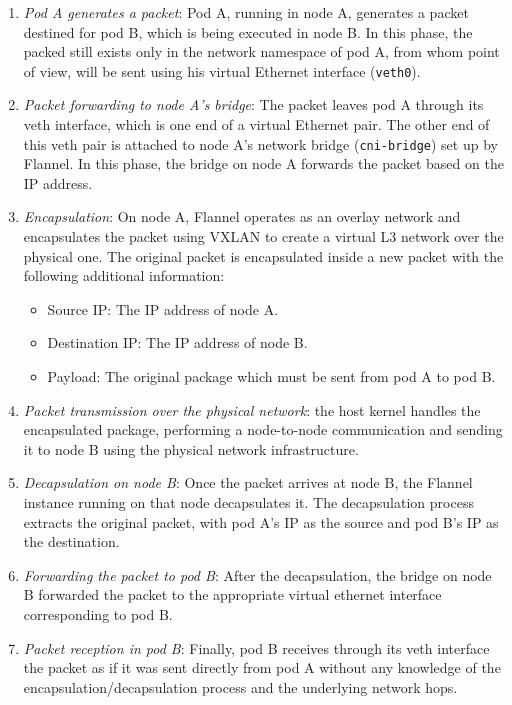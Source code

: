 \begin{enumerate}
  \item \textit{Pod A generates a packet}: Pod A, running in node A, generates a
    packet destined for pod B, which is being executed in node B. In this phase,
    the packed still exists only in the network namespace of pod A, from whom
    point of view, will be sent using his virtual Ethernet interface
    (\texttt{veth0}).
  \item \textit{Packet forwarding to node A's bridge}: The packet leaves pod A
    through its veth interface, which is one end of a virtual Ethernet pair. The
    other end of this veth pair is attached to node A's network bridge
    (\texttt{cni-bridge}) set up by Flannel.
    In this phase, the bridge on node A forwards the packet based on the IP
    address.
  \item \textit{Encapsulation}: On node A, Flannel operates as an overlay
    network and encapsulates the packet using VXLAN to create a virtual L3 network
    over the physical one. The original packet is encapsulated inside a new packet
    with the following additional information:
    \begin{itemize}
      \item Source IP: The IP address of node A.
      \item Destination IP: The IP address of node B.
      \item Payload: The original package which must be sent from pod A to pod B.
    \end{itemize}
  \item \textit{Packet transmission over the physical network}: the host kernel
    handles the encapsulated package, performing a node-to-node communication
    and sending it to node B using the physical network infrastructure.
  \item \textit{Decapsulation on node B}: Once the packet arrives at node B, the
    Flannel instance running on that node decapsulates it. The decapsulation
    process extracts the original packet, with pod A's IP as the source and pod
    B's IP as the destination.
  \item \textit{Forwarding the packet to pod B}: After the decapsulation, the
    bridge on node B forwarded the packet to the appropriate virtual ethernet
    interface corresponding to pod B.
  \item \textit{Packet reception in pod B}: Finally, pod B receives through its
    veth interface the packet as if it was sent directly from pod A without any
    knowledge of the encapsulation/decapsulation process and the underlying
    network hops.
\end{enumerate}

